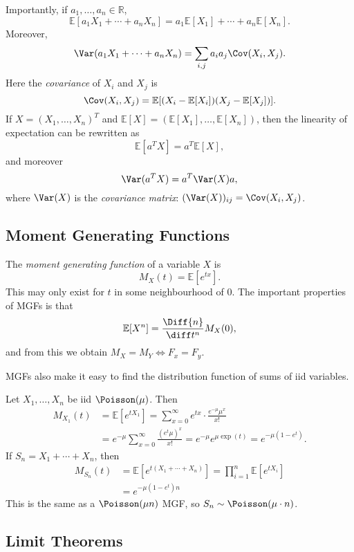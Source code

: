 \documentclass[12pt]{article}
\begin{document}
Importantly, if $a_1, \ldots, a_n \in \mathbb{R}$,
\[
\mathbb{E}[a_1 X_1 + \cdots + a_n X_n] = a_1 \mathbb{E}[X_1] + \cdots + a_n \mathbb{E}[X_n]
.\]
Moreover,
\[
\Var(a_1 X_1 + \cdots + a_n X_n) = \sum_{i,j}a_{i}a_j \Cov(X_i, X_j)
.\]
Here the \emph{covariance} of $X_i$ and $X_j$ is
\[
\Cov(X_i, X_j) = \mathbb{E}[(X_i - \mathbb{E}[X_i])(X_j - \mathbb{E}[X_j])]
.\]
If $X = (X_1, \ldots, X_n)^{T}$ and $\mathbb{E}[X] = (\mathbb{E}[X_1], \ldots, \mathbb{E}[X_n])$, then the linearity of expectation can be rewritten as
\[
\mathbb{E}[a^{T}X] = a^{T}\mathbb{E}[X]
,\]
and moreover
\[
\Var(a^{T}X) = a^{T} \Var(X) a
,\]
where $\Var(X)$ is the \emph{covariance matrix}: $(\Var(X))_{ij} = \Cov(X_i, X_j)$.

\subsection{Moment Generating Functions}

The \emph{moment generating function} of a variable $X$ is
\[
M_X(t) = \mathbb{E}[e^{tx}]
.\]
This may only exist for $t$ in some neighbourhood of $0$. The important properties of MGFs is that
\[
	\mathbb{E}[X^{n}] = \frac{\Diff{n}}{\diff t^{n}} M_X(0)
,\]
and from this we obtain $M_X = M_Y \iff F_x = F_y$.

MGFs also make it easy to find the distribution function of sums of iid variables.

\begin{exbox}
	Let $X_1, \ldots, X_n$ be iid $\Poisson(\mu)$. Then
	\begin{align*}
		M_{X_1}(t) &= \mathbb{E}[e^{tX_1}] = \sum_{x = 0}^{\infty} e^{tx} \cdot \frac{e^{-\mu}\mu^{x}}{x!} \\
			   &= e^{-\mu} \sum_{x = 0}^{\infty} \frac{(e^{t}\mu)^{x}}{x!} = e^{-\mu}e^{\mu \exp(t)} = e^{-\mu(1-e^{t})}.
	\end{align*}
	If $S_n = X_1 + \cdots + X_n$, then
	\begin{align*}
		M_{S_n}(t) &= \mathbb{E}[e^{t(X_1 + \cdots + X_n)}] = \prod_{i=1}^{n}\mathbb{E}[e^{tX_i}] \\
			   &= e^{-\mu(1-e^{t})n}
	\end{align*}
	This is the same as a $\Poisson(\mu n)$ MGF, so $S_n \sim \Poisson(\mu \cdot n)$.
\end{exbox}

\subsection{Limit Theorems}
\label{sub:limit_theorems}
\end{document}
